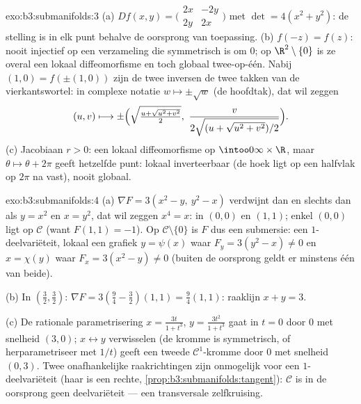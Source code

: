 \begin{solution}{exo:b3:submanifolds:3}
(a) $Df(x,y) = \bigl(\begin{smallmatrix}2x & -2y\\ 2y &
2x\end{smallmatrix}\bigr)$ met $\det = 4(x^2 + y^2)$: de stelling
is in elk punt behalve de oorsprong van toepassing.
(b) $f(-z) = f(z)$: nooit injectief op een verzameling die
symmetrisch is om $0$; op $\R^2\setminus\{0\}$ is ze overal een
lokaal diffeomorfisme en toch globaal twee-op-één. Nabij $(1, 0)
= f(\pm(1, 0))$ zijn de twee inversen de twee takken van de
vierkantswortel: in complexe notatie $w \mapsto \pm\sqrt w$ (de
hoofdtak), dat wil zeggen
\[
(u, v) \longmapsto \pm\Bigl(\sqrt{\tfrac{u +
\sqrt{u^2+v^2}}{2}},\ \frac{v}{2\sqrt{(u +
\sqrt{u^2+v^2})/2}}\Bigr).
\]
(c) Jacobiaan $r > 0$: een lokaal diffeomorfisme op
$\intoo0\infty\times\R$, maar $\theta \mapsto \theta + 2\pi$
geeft hetzelfde punt: lokaal inverteerbaar (de hoek ligt op een
halfvlak op $2\pi$ na vast), nooit globaal.
\end{solution}

\begin{solution}{exo:b3:submanifolds:4}
(a) $\nabla F = 3(x^2 - y,\ y^2 - x)$ verdwijnt dan en slechts
dan als $y = x^2$ en $x = y^2$, dat wil zeggen $x^4 = x$: in
$(0,0)$ en $(1,1)$; enkel $(0,0)$ ligt op $\mathcal C$ (want
$F(1,1) = -1$). Op $\mathcal C\setminus\{0\}$ is $F$ dus een
submersie: een $1$-deelvariëteit, lokaal een grafiek $y =
\psi(x)$ waar $F_y = 3(y^2 - x) \neq 0$ en $x = \chi(y)$ waar
$F_x = 3(x^2 - y) \neq 0$ (buiten de oorsprong geldt er minstens
één van beide).

(b) In $(\frac32, \frac32)$: $\nabla F = 3(\frac94 - \frac32)(1,
1) = \frac94(1,1)$: raaklijn $x + y = 3$.

(c) De rationale parametrisering $x = \frac{3t}{1 + t^3}$, $y =
\frac{3t^2}{1+t^3}$ gaat in $t = 0$ door $0$ met snelheid $(3,
0)$; $x \leftrightarrow y$ verwisselen (de kromme is symmetrisch,
of herparametriseer met $1/t$) geeft een tweede $\mathcal
C^1$-kromme door $0$ met snelheid $(0, 3)$. Twee onafhankelijke
raakrichtingen zijn onmogelijk voor een $1$-deelvariëteit (haar
 is een rechte,
\cref{prop:b3:submanifolds:tangent}): $\mathcal C$ is in de
oorsprong geen deelvariëteit --- een transversale
zelfkruising.
\end{solution}

